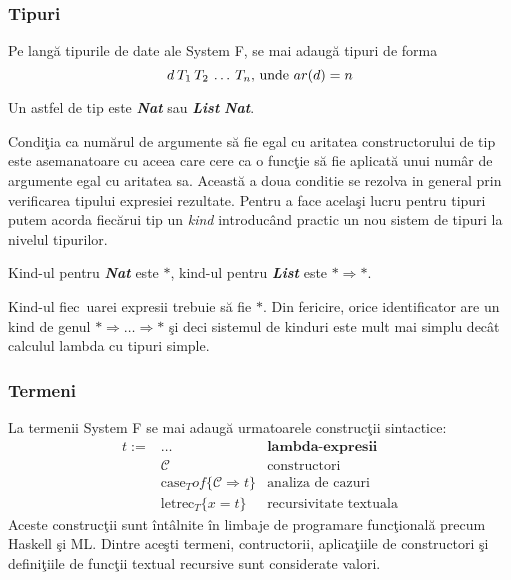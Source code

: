 \subsubsection{Tipuri}

Pe lang\u a tipurile de date ale System F, se mai adaug\u a tipuri de forma
$$ d\hspace{2pt} T_1\hspace{2pt} T_2\hspace{2pt} \dots\hspace{2pt} T_n  \text{, unde } ar(d) = n$$
\begin{example}
Un astfel de tip este \emph{\textbf{Nat}} sau \emph{\textbf{List}} \app \emph{\textbf{Nat}}.
\end{example}
Condi\c tia ca num\u arul de argumente s\u a fie egal cu aritatea constructorului de tip este asemanatoare cu aceea care cere ca o func\c tie s\u a fie aplicat\u a unui num\^ ar de argumente egal cu aritatea sa. Aceast\u a a doua conditie se rezolva in general prin verificarea tipului expresiei rezultate. Pentru a face acela\c si lucru pentru tipuri putem acorda fiec\u arui tip un \emph{kind} introduc\^ and practic un nou sistem de tipuri la nivelul tipurilor.
\begin{example}
Kind-ul pentru \emph{\textbf{Nat}} este $*$, kind-ul pentru \emph{\textbf{List}} este $* \Rightarrow *$.
\end{example}
Kind-ul fiec\ uarei expresii trebuie s\u a fie $*$. Din fericire, orice identificator are un kind de genul $* \Rightarrow \dots \Rightarrow *$ \c si deci sistemul de kinduri este mult mai simplu dec\^ at calculul lambda cu tipuri simple.

\subsubsection{Termeni}
La termenii System F se mai adaug\u a urmatoarele construc\c tii sintactice:
\begin{align*}
t :=  &\dots                                    &\textbf{lambda-expresii}\\
      &\mathcal{C}                              &\text{constructori}\\
      &\text{case}_T of \{\mathcal{C} \Rightarrow t\}     &\text{analiza de cazuri}\\
      &\text{letrec}_T \{ x = t \}                       &\text{recursivitate textuala}
\end{align*}
Aceste construc\c tii sunt \^ int\^ alnite \^ in limbaje de programare func\c tional\u a precum Haskell \c si ML. Dintre ace\c sti termeni, contructorii, aplica\c tiile de constructori \c si defini\c tiile de func\c tii textual recursive sunt considerate valori.

